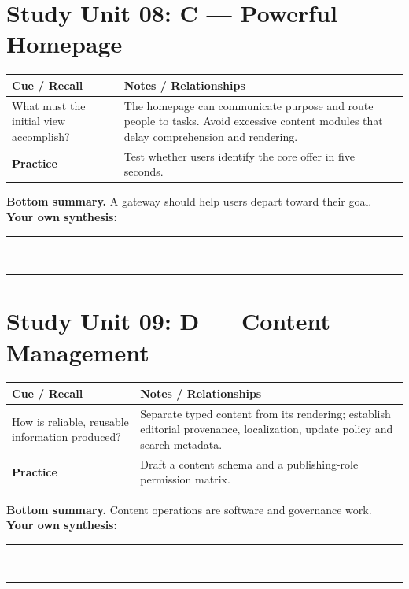 \documentclass[11pt]{article}
\begin{document}
\section{Study Unit 08: C — Powerful Homepage}
\begin{longtable}{@{}p{.27\linewidth}p{.66\linewidth}@{}}\toprule
\textbf{Cue / Recall} & \textbf{Notes / Relationships}\\\midrule\endhead
What must the initial view accomplish? & The homepage can communicate purpose and route people to tasks. Avoid excessive content modules that delay comprehension and rendering.\\
\addlinespace[4mm]
\textbf{Practice} & Test whether users identify the core offer in five seconds.\\\bottomrule\end{longtable}
\begin{dosnotebox}\textbf{Bottom summary.} A gateway should help users depart toward their goal.\\[2mm]
\textbf{Your own synthesis:} \rule{.72\linewidth}{.4pt}\\[4mm]
\rule{.96\linewidth}{.4pt}\end{dosnotebox}

\section{Study Unit 09: D — Content Management}
\begin{longtable}{@{}p{.27\linewidth}p{.66\linewidth}@{}}\toprule
\textbf{Cue / Recall} & \textbf{Notes / Relationships}\\\midrule\endhead
How is reliable, reusable information produced? & Separate typed content from its rendering; establish editorial provenance, localization, update policy and search metadata.\\
\addlinespace[4mm]
\textbf{Practice} & Draft a content schema and a publishing-role permission matrix.\\\bottomrule\end{longtable}
\begin{dosnotebox}\textbf{Bottom summary.} Content operations are software and governance work.\\[2mm]
\textbf{Your own synthesis:} \rule{.72\linewidth}{.4pt}\\[4mm]
\rule{.96\linewidth}{.4pt}\end{dosnotebox}
\end{document}
